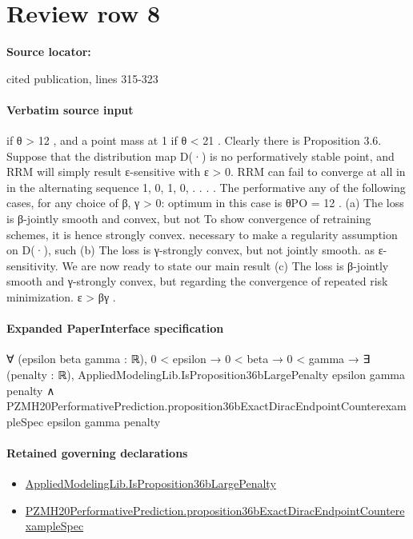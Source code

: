 \documentclass[10pt]{article}
\begin{document}
\section*{Review row 8}
\textbf{Source locator:} {\footnotesize\raggedright cited publication, lines 315-\allowbreak{}323\par}
\paragraph{Verbatim source input}
\begin{ReviewVerbatim}
if θ > 12 , and a point mass at 1 if θ < 21 . Clearly there is     Proposition 3.6. Suppose that the distribution map D(·) is
no performatively stable point, and RRM will simply result         ε-sensitive with ε > 0. RRM can fail to converge at all in
in the alternating sequence 1, 0, 1, 0, . . . . The performative   any of the following cases, for any choice of β, γ > 0:
optimum in this case is θPO = 12 .
                                                                    (a) The loss is β-jointly smooth and convex, but not
To show convergence of retraining schemes, it is hence                  strongly convex.
necessary to make a regularity assumption on D(·), such             (b) The loss is γ-strongly convex, but not jointly smooth.
as ε-sensitivity. We are now ready to state our main result         (c) The loss is β-jointly smooth and γ-strongly convex, but
regarding the convergence of repeated risk minimization.                ε > βγ .
\end{ReviewVerbatim}



\paragraph{Expanded PaperInterface specification}
\begin{ReviewVerbatim}
∀ (epsilon beta gamma : ℝ),
  0 < epsilon →
    0 < beta →
      0 < gamma →
        ∃ (penalty : ℝ),
          AppliedModelingLib.IsProposition36bLargePenalty epsilon gamma penalty ∧
            PZMH20PerformativePrediction.proposition36bExactDiracEndpointCounterexampleSpec epsilon gamma penalty
\end{ReviewVerbatim}

\paragraph{Retained governing declarations}
\begin{itemize}\raggedright
\item \hyperlink{governing-declaration-ee9adf0c7d04f002}{Applied\allowbreak{}Modeling\allowbreak{}Lib.\allowbreak{}Is\allowbreak{}Proposition36b\allowbreak{}Large\allowbreak{}Penalty}
\item \hyperlink{governing-declaration-e0c24b576a9d5f99}{PZMH20\allowbreak{}Performative\allowbreak{}Prediction.\allowbreak{}proposition36b\allowbreak{}Exact\allowbreak{}Dirac\allowbreak{}Endpoint\allowbreak{}Counterexample\allowbreak{}Spec}
\end{itemize}
\end{document}
